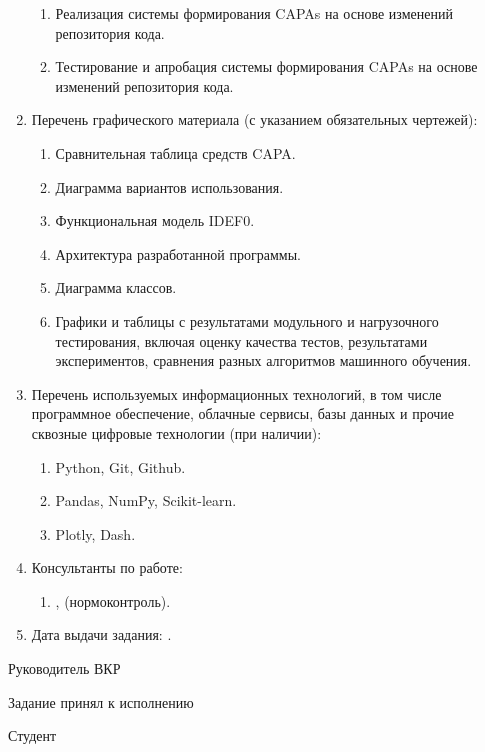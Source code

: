 \begin{enumerate}[1.]
\begin{enumerate}[label=\theenumi\arabic*.]
\item Реализация системы формирования CAPAs на основе изменений репозитория кода.
\item Тестирование и апробация системы формирования CAPAs на основе изменений репозитория кода.
\end{enumerate}
\item Перечень графического материала (с указанием обязательных чертежей): 
\begin{enumerate}[label=\theenumi\arabic*.]
\item Сравнительная таблица средств CAPA.
\item Диаграмма вариантов использования.
\item Функциональная модель IDEF0.
\item Архитектура разработанной программы.
\item Диаграмма классов.
\item Графики и таблицы с результатами модульного и нагрузочного тестирования, включая оценку качества тестов, результатами экспериментов, сравнения разных алгоритмов машинного обучения.
\end{enumerate}
\item Перечень используемых информационных технологий, в том числе программное обеспечение, облачные сервисы, базы данных и прочие сквозные цифровые технологии (при наличии):
\begin{enumerate}[label=\theenumi\arabic*.]
\item Python, Git, Github.
\item Pandas, NumPy, Scikit-learn.
\item Plotly, Dash.
\end{enumerate}
\item Консультанты по работе:
\begin{enumerate}[label=\theenumi\arabic*.] 
\item {\emakefirstuc{\ConsultantNormDegree}, \ConsultantNorm{} (нормоконтроль).} %
\end{enumerate}
\item Дата выдачи задания: {\thesisStartDate.}
\end{enumerate}

\intervalS%

Руководитель ВКР {\hspace*{0.1\textheight} \Supervisor}


Задание принял к исполнению {\thesisStartDate}

\intervalS%

Студент {\hspace*{0.1\textheight}  \Author}



